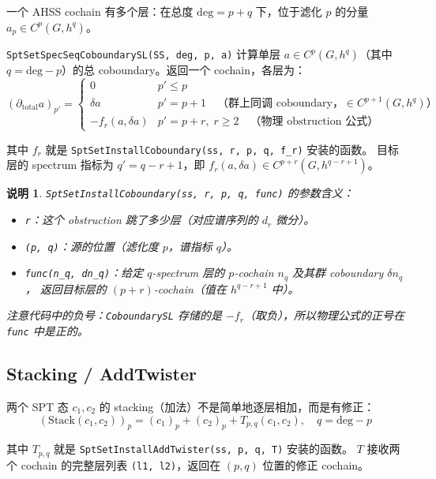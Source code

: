 \documentclass[a4paper,fontset=ubuntu,12pt]{ctexart}
\newtheorem{remark}[definition]{说明}
\begin{document}
一个 AHSS cochain 有多个层：在总度 $\mathrm{deg} = p + q$ 下，位于滤化 $p$ 的分量 $a_p \in C^p(G, h^q)$。

\texttt{SptSetSpecSeqCoboundarySL(SS, deg, p, a)} 计算单层 $a \in C^p(G, h^q)$（其中 $q = \mathrm{deg} - p$）的总 coboundary。返回一个 cochain，各层为：
\begin{equation}
\label{eq:coboundary-sl}
(\partial_{\mathrm{total}} a)_{p'} =
\begin{cases}
0 & p' \leq p \\
\delta a & p' = p + 1 \quad \text{（群上同调 coboundary，} \in C^{p+1}(G, h^q)\text{）} \\
-f_r(a, \delta a) & p' = p + r, \; r \geq 2 \quad \text{（物理 obstruction 公式）}
\end{cases}
\end{equation}

其中 $f_r$ 就是 \texttt{SptSetInstallCoboundary(ss, r, p, q, f\_r)} 安装的函数。
目标层的 spectrum 指标为 $q' = q - r + 1$，即 $f_r(a, \delta a) \in C^{p+r}(G, h^{q-r+1})$。

\begin{remark}
\texttt{SptSetInstallCoboundary(ss, r, p, q, func)} 的参数含义：
\begin{itemize}
\item \texttt{r}：这个 obstruction 跳了多少层（对应谱序列的 $d_r$ 微分）。
\item \texttt{(p, q)}：源的位置（滤化度 $p$，谱指标 $q$）。
\item \texttt{func(n\_q, dn\_q)}：给定 $q$-spectrum 层的 $p$-cochain $n_q$ 及其群 coboundary $\delta n_q$，
      返回目标层的 $(p+r)$-cochain（值在 $h^{q-r+1}$ 中）。
\end{itemize}
注意代码中的负号：\texttt{CoboundarySL} 存储的是 $-f_r$（取负），所以物理公式的正号在 \texttt{func} 中是正的。
\end{remark}

\subsection{Stacking / AddTwister}

两个 SPT 态 $c_1, c_2$ 的 stacking（加法）不是简单地逐层相加，而是有修正：
\begin{equation}
\label{eq:stacking}
(\mathrm{Stack}(c_1, c_2))_p = (c_1)_p + (c_2)_p + T_{p,q}(c_1, c_2), \quad q = \mathrm{deg} - p
\end{equation}

其中 $T_{p,q}$ 就是 \texttt{SptSetInstallAddTwister(ss, p, q, T)} 安装的函数。
$T$ 接收两个 cochain 的完整层列表 \texttt{(l1, l2)}，返回在 $(p, q)$ 位置的修正 cochain。
\end{document}
